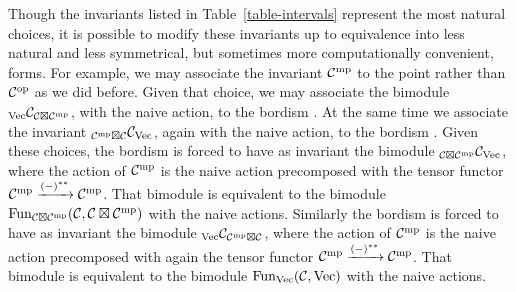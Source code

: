 \documentclass{amsart}
\begin{document}
\begin{remark} \label{remark-altintervals}
Though the invariants listed in Table~\ref{table-intervals} represent the most natural choices, it is possible to modify these invariants up to equivalence into less natural and less symmetrical, but sometimes more computationally convenient, forms.  For example, we may associate the invariant $\mathcal C^{\mathrm{mp}}$ to the point
rather than $\mathcal C^{\mathrm{op}}$ as we did before.  Given that choice, we may associate the bimodule ${}_{\mathrm{Vec}} \mathcal C_{\mathcal C \boxtimes \mathcal C^{\mathrm{mp}}}$, with the naive action, to the bordism
.
At the same time we associate the invariant ${}_{\mathcal C^{\mathrm{mp}} \boxtimes \mathcal C} \mathcal C_{\mathrm{Vec}}$, again with the naive action, to the bordism
.
Given these choices, the bordism
is forced to have as invariant the bimodule ${}_{\mathcal C \boxtimes \mathcal C^{\mathrm{mp}}} \mathcal C_{\mathrm{Vec}}$, where the action of $\mathcal C^{\mathrm{mp}}$ is the naive action precomposed with the tensor functor $\mathcal C^{\mathrm{mp}} \xrightarrow{(-)^{**}} \mathcal C^{\mathrm{mp}}$.  That bimodule is equivalent to the bimodule $\operatorname{Fun}_{\mathcal C \boxtimes \mathcal C^{\mathrm{mp}}}(\mathcal C,\mathcal C \boxtimes \mathcal C^{\mathrm{mp}})$ with the naive actions.  Similarly the bordism
is forced to have as invariant the bimodule ${}_{\mathrm{Vec}} \mathcal C_{\mathcal C^{\mathrm{mp}} \boxtimes \mathcal C}$, where the action of $\mathcal C^{\mathrm{mp}}$ is the naive action precomposed with again the tensor functor $\mathcal C^{\mathrm{mp}} \xrightarrow{(-)^{**}} \mathcal C^{\mathrm{mp}}$.  That bimodule is equivalent to the bimodule $\operatorname{Fun}_{\mathrm{Vec}}(\mathcal C,\mathrm{Vec})$ with the naive actions.
\end{remark}
\end{document}
